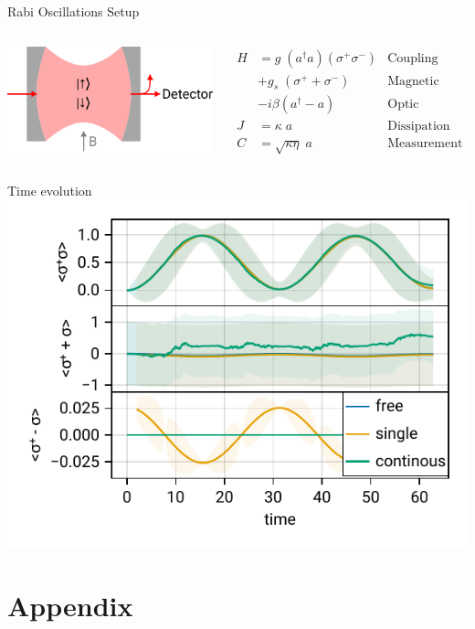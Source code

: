 \documentclass[handout]{beamer}
\begin{document}
\begin{frame}{Rabi Oscillations Setup}
	\begin{columns}
		\begin{center}
			\includegraphics{figures/rabi.pdf}
		\end{center}

		\begin{align*}
			H &= g\; (a^\dagger a) (\sigma^+ \sigma^-) &\text{Coupling}\\
			&+ g_s\; (\sigma^+ + \sigma^-) &\text{Magnetic}\\
			&- i \beta (a^\dagger - a) &\text{Optic}\\
			J &= \kappa\; a &\text{Dissipation}\\
			C &= \sqrt{\kappa\eta}\; a &\text{Measurement}
		\end{align*}
		
	\end{columns}

\end{frame}

\begin{frame}{Time evolution}
	\includegraphics{figures/02 rabi w measurement.pdf}
\end{frame}


{
	\begin{frame}[plain]{}\end{frame}
}

\section{Appendix}
% 
\end{document}
